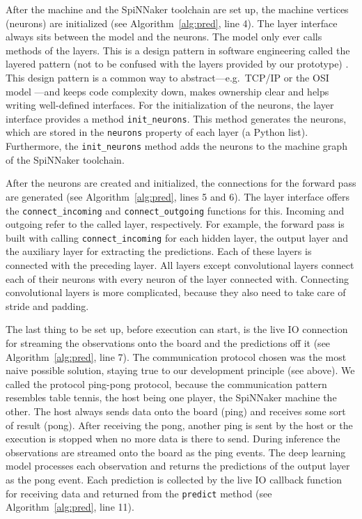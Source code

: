 \documentclass[]{article}
\begin{document}
After the machine and the SpiNNaker toolchain are set up, the
machine vertices (neurons) are initialized
(see Algorithm~\ref{alg:pred}, line 4).
The layer interface always sits between the model and the neurons.
The model only ever calls methods of the layers.
This is a design pattern in software engineering called the layered
pattern (not to be confused with the layers provided by our
prototype) \citep{morlion_2018}.
This design pattern is a common way to abstract---e.g.\ TCP/IP or the
OSI model \citep{tanenbaum_et_al_2013}---and keeps code complexity
down, makes ownership clear and helps writing well-defined interfaces.
For the initialization of the neurons, the layer interface provides
a method \texttt{init\_neurons}.
This method generates the neurons, which are stored in the
\texttt{neurons} property of each layer (a Python list).
Furthermore, the \texttt{init\_neurons} method adds the neurons to
the machine graph of the SpiNNaker toolchain.

After the neurons are created and initialized, the connections for
the forward pass are generated (see Algorithm~\ref{alg:pred}, lines 5
and 6).
The layer interface offers the \texttt{connect\_incoming} and
\texttt{connect\_outgoing} functions for this.
Incoming and outgoing refer to the called layer, respectively.
For example, the forward pass is built with calling
\texttt{connect\_incoming} for each hidden layer, the output layer
and the auxiliary layer for extracting the predictions.
Each of these layers is connected with the preceding layer.
All layers except convolutional layers connect each of their neurons
with every neuron of the layer connected with.
Connecting convolutional layers is more complicated, because they
also need to take care of stride and padding.

The last thing to be set up, before execution can start, is the live
IO connection for streaming the observations onto the board and the
predictions off it (see Algorithm~\ref{alg:pred}, line 7).
The communication protocol chosen was the most naive possible
solution, staying true to our development principle (see above).
We called the protocol ping-pong protocol, because the communication
pattern resembles table tennis, the host being one player, the
SpiNNaker machine the other.
The host always sends data onto the board (ping) and receives some
sort of result (pong).
After receiving the pong, another ping is sent by the host or the
execution is stopped when no more data is there to send.
During inference the observations are streamed onto the board as the
ping events.
The deep learning model processes each observation and returns the
predictions of the output layer as the pong event.
Each prediction is collected by the live IO callback function for
receiving data and returned from the \texttt{predict} method
(see Algorithm~\ref{alg:pred}, line 11).
\end{document}
